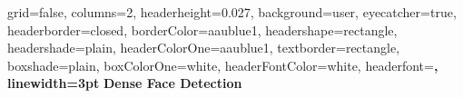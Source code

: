 \documentclass[paperwidth=24in,paperheight=48in, fontscale=0.4166666666666]{baposter}
\begin{document}
\begin{poster}{
  grid=false,
  columns=2,
  headerheight=0.027\textheight,
  background=user,
  eyecatcher=true,
  headerborder=closed,
  borderColor=aaublue1,
  headershape=rectangle,
  headershade=plain,
  headerColorOne=aaublue1,
  textborder=rectangle,
  boxshade=plain,
  boxColorOne=white,
  headerFontColor=white,
  headerfont=\Large\sf\bf,
  linewidth=3pt
}
{
}
{\color{white}\bf
\vspace{12pt}
  Dense Face Detection
}
{
}



\end{poster}
\end{document}
